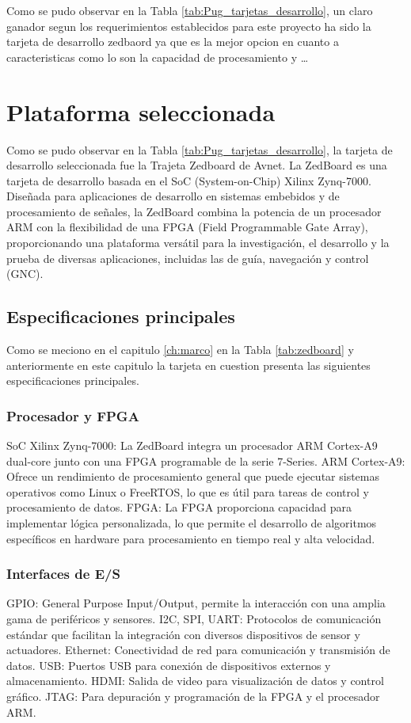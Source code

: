     Como se pudo observar en la Tabla \ref{tab:Pug_tarjetas_desarrollo}, un claro ganador segun los requerimientos establecidos para este proyecto ha sido la tarjeta de desarrollo zedbaord ya que es la mejor opcion en cuanto a caracteristicas como lo son la capacidad de procesamiento y \dots

\section{Plataforma seleccionada}

Como se pudo observar en la Tabla \ref{tab:Pug_tarjetas_desarrollo}, la tarjeta de desarrollo seleccionada fue la Trajeta Zedboard de Avnet. La ZedBoard es una tarjeta de desarrollo basada en el SoC (System-on-Chip) Xilinx Zynq-7000. Diseñada para aplicaciones de desarrollo en sistemas embebidos y de procesamiento de señales, la ZedBoard combina la potencia de un procesador ARM con la flexibilidad de una FPGA (Field Programmable Gate Array), proporcionando una plataforma versátil para la investigación, el desarrollo y la prueba de diversas aplicaciones, incluidas las de guía, navegación y control (GNC).

\subsection{Especificaciones principales}

Como se meciono en el capitulo \ref{ch:marco} en la Tabla \ref{tab:zedboard} y anteriormente en este capitulo la tarjeta en cuestion presenta las siguientes especificaciones principales.

\subsubsection{Procesador y FPGA}
SoC Xilinx Zynq-7000: La ZedBoard integra un procesador ARM Cortex-A9 dual-core junto con una FPGA programable de la serie 7-Series.
ARM Cortex-A9: Ofrece un rendimiento de procesamiento general que puede ejecutar sistemas operativos como Linux o FreeRTOS, lo que es útil para tareas de control y procesamiento de datos.
FPGA: La FPGA proporciona capacidad para implementar lógica personalizada, lo que permite el desarrollo de algoritmos específicos en hardware para procesamiento en tiempo real y alta velocidad.
\subsubsection{Interfaces de E/S}
GPIO: General Purpose Input/Output, permite la interacción con una amplia gama de periféricos y sensores.
I2C, SPI, UART: Protocolos de comunicación estándar que facilitan la integración con diversos dispositivos de sensor y actuadores.
Ethernet: Conectividad de red para comunicación y transmisión de datos.
USB: Puertos USB para conexión de dispositivos externos y almacenamiento.
HDMI: Salida de video para visualización de datos y control gráfico.
JTAG: Para depuración y programación de la FPGA y el procesador ARM.
